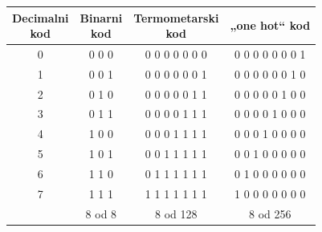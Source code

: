 \renewcommand{\arraystretch}{1.2}\setlength{\tabcolsep}{10pt}
\begin{tabular}{cccc}\toprule\makecell{Decimalni\\kod}&\makecell{Binarni\\kod}&\makecell{Termometarski\\kod}&„one hot“ kod\\\midrule
0&0 0 0&0 0 0 0 0 0 0&0 0 0 0 0 0 0 1\\
1&0 0 1&0 0 0 0 0 0 1&0 0 0 0 0 0 1 0\\
2&0 1 0&0 0 0 0 0 1 1&0 0 0 0 0 1 0 0\\
3&0 1 1&0 0 0 0 1 1 1&0 0 0 0 1 0 0 0\\
4&1 0 0&0 0 0 1 1 1 1&0 0 0 1 0 0 0 0\\
5&1 0 1&0 0 1 1 1 1 1&0 0 1 0 0 0 0 0\\
6&1 1 0&0 1 1 1 1 1 1&0 1 0 0 0 0 0 0\\
7&1 1 1&1 1 1 1 1 1 1&1 0 0 0 0 0 0 0\\
\bottomrule &8 od 8&8 od 128&8 od 256\end{tabular}
